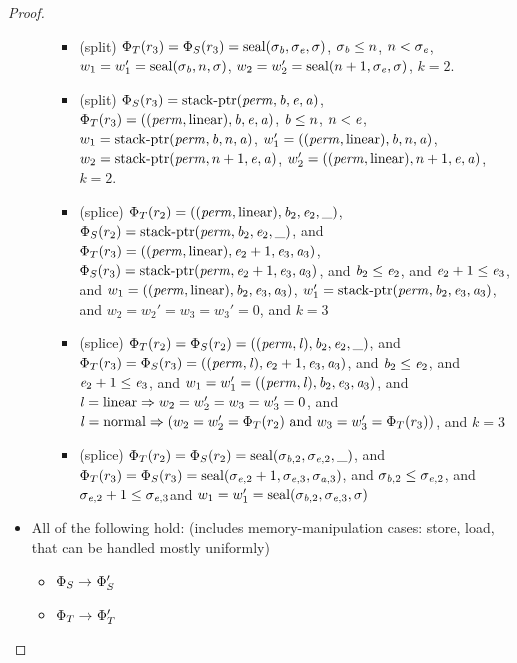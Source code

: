 \begin{proof}
\begin{itemize}
\begin{itemize}
\begin{itemize}
    \item (split) $\Phi_T(r_3) = \Phi_S(r_3) = \mathrm{seal}(\sigma_{\mathit{b}},\sigma_{\mathit{e}},\sigma)$, $\sigma_{\mathit{b}} \leq n$, $n < \sigma_{\mathit{e}}$, $w_1 = w_1' = \mathrm{seal}(\sigma_{\mathit{b}},n,\sigma)$, $w_2 = w_2' = \mathrm{seal}(n+1,\sigma_{\mathit{e}},\sigma)$, $k=2$.
    \item (split) $\Phi_S(r_3) = \mathrm{stack\text{-}ptr}(\mathit{perm},\mathit{b},\mathit{e},\mathit{a})$, $\Phi_T(r_3) = ((\mathit{perm},\mathrm{linear}),\mathit{b},\mathit{e},\mathit{a})$, $\mathit{b} \leq n$, $n < \mathit{e}$, $w_1 = \mathrm{stack\text{-}ptr}(\mathit{perm},\mathit{b},n,\mathit{a})$, $w_1' = ((\mathit{perm},\mathrm{linear}),\mathit{b},n,\mathit{a})$, $w_2 = \mathrm{stack\text{-}ptr}(\mathit{perm},n+1,\mathit{e},\mathit{a})$, $w_2' = ((\mathit{perm},\mathrm{linear}),n+1,\mathit{e},\mathit{a})$, $k=2$.
    \item (splice) $\Phi_T(r_2) = ((\mathit{perm},\mathrm{linear}),\mathit{b}_2,\mathit{e}_2,\_)$,
      $\Phi_S(r_2) = \mathrm{stack\text{-}ptr}(\mathit{perm},\mathit{b}_2,\mathit{e}_2,\_)$, and
      $\Phi_T(r_3) = ((\mathit{perm},\mathrm{linear}),\mathit{e}_2+1,\mathit{e}_3,\mathit{a}_3)$,
      $\Phi_S(r_3) = \mathrm{stack\text{-}ptr}(\mathit{perm},\mathit{e}_2+1,\mathit{e}_3,\mathit{a}_3)$, and
      $\mathit{b}_2 \leq \mathit{e}_2$, and
      $\mathit{e}_2+1 \leq \mathit{e}_3$, and
      $w_1=((\mathit{perm},\mathrm{linear}),\mathit{b}_2,\mathit{e}_3,\mathit{a}_3)$, $w_1'=
      \mathrm{stack\text{-}ptr}(\mathit{perm},\mathit{b}_2,\mathit{e}_3,\mathit{a}_3)$, and
      $w_2 = w_2' = w_3 = w_3' = 0$, and
      $k=3$
    \item (splice) $\Phi_T(r_2) = \Phi_S(r_2) =
      ((\mathit{perm},\mathit{l}),\mathit{b}_2,\mathit{e}_2,\_)$, and
      $\Phi_T(r_3) = \Phi_S(r_3) = ((\mathit{perm},\mathit{l}),\mathit{e}_2+1,\mathit{e}_3,\mathit{a}_3)$,
      and
      $\mathit{b}_2 \leq \mathit{e}_2$, and $\mathit{e}_2+1 \leq \mathit{e}_3$, and
      $w_1=w_1'=((\mathit{perm},\mathit{l}),\mathit{b}_2,\mathit{e}_3,\mathit{a}_3)$, and
      $\mathit{l} = \mathrm{linear} \Rightarrow w_2 = w_2' = w_3 = w_3' = 0$, and
      $\mathit{l} = \mathrm{normal} \Rightarrow (w_2 = w_2' = \Phi_T(r_2) \text{ and } w_3 =
      w_3' = \Phi_T(r_3))$, and $k=3$
    \item (splice) $\Phi_T(r_2) = \Phi_S(r_2) = \mathrm{seal}(\sigma_{\mathit{b},2},\sigma_{\mathit{e},2},\_)$, and $\Phi_T(r_3) = \Phi_S(r_3) = \mathrm{seal}(\sigma_{\mathit{e},2}+1,\sigma_{\mathit{e},3},\sigma_{\mathit{a},3})$, and $\sigma_{\mathit{b},2} \leq \sigma_{\mathit{e},2}$, and $\sigma_{\mathit{e},2} + 1 \leq \sigma_{\mathit{e},3}$and $w_1 = w_1' = \mathrm{seal}(\sigma_{\mathit{b},2}, \sigma_{\mathit{e},3}, \sigma)$
      \end{itemize}
  \end{itemize}
\item All of the following hold: (includes memory-manipulation cases: store, load, that can be handled mostly uniformly)
  \begin{itemize}
  \item $\Phi_S \rightarrow^{} \Phi_S'$
  \item $\Phi_T \rightarrow^{} \Phi_T'$

\end{itemize}
\end{itemize}
\end{proof}
